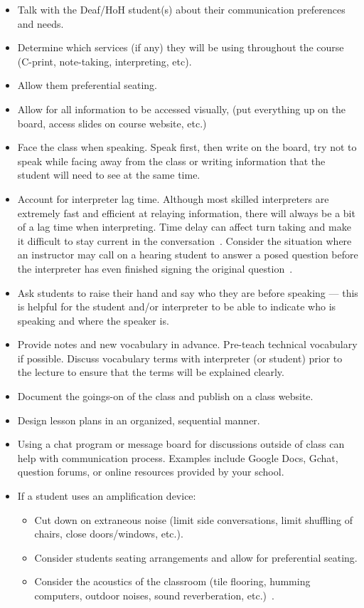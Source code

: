 \documentclass[conference]{IEEEtran}
\begin{document}
\begin{itemize}
\item Talk with the Deaf/HoH student(s) about their communication preferences and needs.
\item Determine which services (if any) they will be using throughout the course (C-print, note-taking, interpreting, etc).
\item Allow them preferential seating.
\item Allow for all information to be accessed visually, (put everything up on the board, access slides on course website, etc.)
\item Face the class when speaking. Speak first, then write on the board, try not to speak while facing away from the class or writing information that the student will need to see at the same time.
\item Account for interpreter lag time. Although most skilled interpreters are extremely fast and efficient at relaying information, there will always be a bit of a lag time when interpreting. Time delay can affect turn taking and make it difficult to stay current in the conversation~\cite{Schick01012006}. Consider the situation where an instructor may call on a hearing student to answer a posed question before the interpreter has even finished signing the original question~\cite{IRRODL1015}.
\item Ask students to raise their hand and say who they are before speaking --- this is helpful for the student and/or interpreter to be able to indicate who is speaking and where the speaker is.
\item Provide notes and new vocabulary in advance. Pre-teach technical vocabulary if possible. Discuss vocabulary terms with interpreter (or student) prior to the lecture to ensure that the terms will be explained clearly.
\item Document the goings-on of the class and publish on a class website.
\item Design lesson plans in an organized, sequential manner.
\item Using a chat program or message board for discussions outside of class can help with communication process. Examples include Google Docs, Gchat, question forums, or online resources provided by your school.


\item If a student uses an amplification device:
\begin{itemize}
\item Cut down on extraneous noise (limit side conversations, limit shuffling of chairs, close doors/windows, etc.).
\item Consider students seating arrangements and allow for preferential seating.
\item Consider the acoustics of the classroom (tile flooring, humming computers, outdoor noises, sound reverberation, etc.)~\cite{soundproofing_bibtex}.
 \end{itemize}

\end{itemize}
\end{document}
